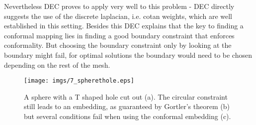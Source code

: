 Nevertheless DEC proves to apply very well to this problem - DEC directly suggests the use of the discrete laplacian, i.e. cotan weights, which are well established in this setting. Besides this DEC explains that the key to finding a conformal mapping lies in finding a good boundary constraint that enforces conformality. But choosing the boundary constraint only by looking at the boundary might fail, for optimal solutions the boundary would need to be chosen depending on the rest of the mesh.

\begin{figure}
\begin{center}
\texttt{[image: imgs/7\_spherethole.eps]}%
\end{center}
\caption{A sphere with a T shaped hole cut out (a). The circular constraint still leads to an embedding, as guaranteed by Gortler's theorem (b) but several conditions fail when using the conformal embedding (c).}%
\label{fig:6_Thole}%
\end{figure}








		

